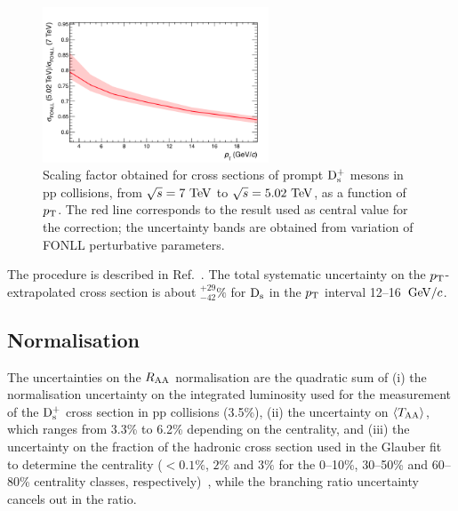 \begin{figure}[!h]
\centering
 \includegraphics[width=0.6\textwidth]{FigCap5/FONLLscaling7To5TeV.png}
 \caption{Scaling factor obtained for cross sections of prompt ${\rm D_s^+}$ mesons in pp collisions, from $\sqrt{s}=7~\mathrm{TeV}$ to $\sqrt{s}=5.02~\mathrm{TeV}$, as a function of $p_{\rm T}$. The red line corresponds to the result used as central value for the correction; the uncertainty bands are obtained from variation of FONLL perturbative parameters. }
 \label{fig:FONLLscalFact}
\end{figure}
The procedure is described in Ref.~\cite{Adam:2015sza}. The total 
systematic uncertainty on the $p_{\rm T}$-extrapolated cross section is about 
$^{+29}_{-42}\%$ for ${\rm D_s}$ in the $p_{\rm T}$ interval 12--16~$\mathrm{GeV}/c$.


\subsection{Normalisation}
\label{sec:NormalizSyst}
The uncertainties on the $R_{\rm AA}$ normalisation are the quadratic sum of 
(i) the normalisation uncertainty on the integrated luminosity used for the measurement of the ${\rm D_s^+}$ cross section in pp collisions (3.5\%), 
(ii) the uncertainty on $\langle T_{\rm AA} \rangle$, which ranges from 3.3\% to 6.2\% depending on the centrality, and
(iii) the uncertainty on the fraction of the hadronic cross section used in the 
Glauber fit to determine the centrality ($<0.1\%$, $2\%$ and $3\%$ for the 0--10\%, 30--50\% 
and 60--80\% centrality classes, respectively)~\cite{Adam:2015sza}, while the branching ratio uncertainty cancels out in the 
ratio.

